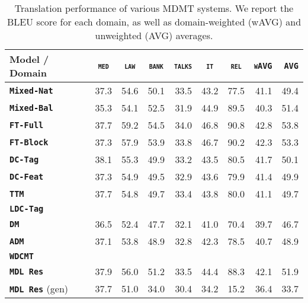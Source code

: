 \documentclass[11pt]{article}
\newcommand{\fyTodo}[1]{\Todo[FY:]{\textcolor{orange}{#1}}}
\newcommand{\domain}[1]{\texttt{\textsc{#1}}}
\newcommand{\system}[1]{\texttt{\textbf{#1}}}
\begin{document}
\fyTodo{Importance of sharing and unsharing}

\begin{table}
  \centering
  \fyTodo{Fix column size}
  \begin{tabular}{|p{3cm}|*{8}{r|}} \hline
    Model / Domain & \multicolumn{1}{c|}{\domain{med}} & \multicolumn{1}{c|}{\domain{law}} & \multicolumn{1}{c|}{\domain{bank}} & \multicolumn{1}{c|}{\domain{talks}} & \multicolumn{1}{c|}{\domain{it}} & \multicolumn{1}{c|}{\domain{rel}} & \domain{wAVG} & \domain{AVG}\\ \hline
    \system{Mixed-Nat}  & 37.3 & 54.6 & 50.1 & 33.5 & 43.2 & 77.5  & 41.1&49.4\\
    \system{Mixed-Bal}   &  35.3 & 54.1 & 52.5 & 31.9 & 44.9 & 89.5 & 40.3&51.4\\
    \system{FT-Full}       & 37.7 & 59.2 & 54.5 & 34.0 & 46.8 & 90.8   & 42.8&53.8\\
   \system{FT-Block}     & 37.3 & 57.9 & 53.9 & 33.8 & 46.7 & 90.2    & 42.3&53.3\\ \hline


    \system{DC-Tag}   & 38.1 & 55.3 & 49.9   & 33.2 & 43.5 & 80.5 &41.7 & 50.1\\
    \system{DC-Feat}  & 37.3   & 54.9 & 49.5   & 32.9 & 43.6 & 79.9 &41.4 & 49.9\\
    \system{TTM}        & 37.7 & 54.8 & 49.7 & 33.4 & 43.8 & 80.0 &41.1 & 49.7\\
    \system{LDC-Tag} &&&&& &&&\\
    \system{DM}             & 36.5 & 52.4  & 47.7& 32.1 & 41.0 & 70.4 & 39.7 & 46.7 \\
    \system{ADM}           & 37.1 & 53.8  & 48.9 &32.8 & 42.3 & 78.5 & 40.7 & 48.9 \\
    \system{WDCMT}      & & & & & & & & \\
    \system{MDL Res}     & 37.9 & 56.0  & 51.2   & 33.5   &  44.4  & 88.3 & 42.1 & 51.9\\
    \system{MDL Res} (gen)           & 37.7 & 51.0 & 34.0 & 30.4 & 34.2 & 15.2 & 36.4 & 33.7\\
     \hline
  \end{tabular}
  \caption{Translation performance of various MDMT systems. We report the BLEU score for each domain, as well as domain-weighted (wAVG) and unweighted (AVG) averages.}
  \label{tab:performance}
\end{table}
\end{document}
